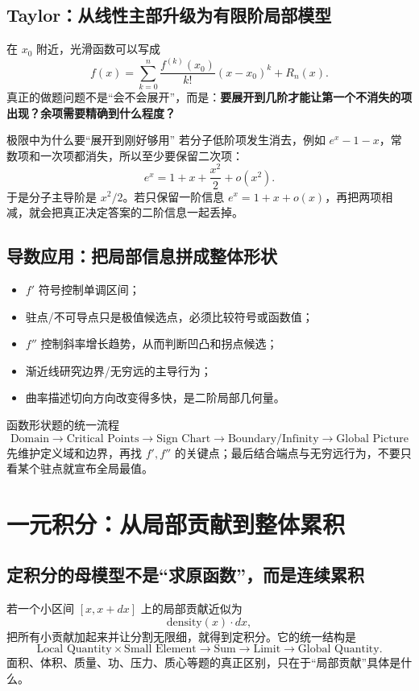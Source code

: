 \documentclass[11pt,a4paper,openany]{ctexbook}
\newcommand{\key}[1]{\textbf{\color{deep}#1}}
\begin{document}
\section{Taylor：从线性主部升级为有限阶局部模型}
在 $x_0$ 附近，光滑函数可以写成
\[
f(x)=\sum_{k=0}^{n}\frac{f^{(k)}(x_0)}{k!}(x-x_0)^k+R_n(x).
\]
真正的做题问题不是“会不会展开”，而是：\key{要展开到几阶才能让第一个不消失的项出现？余项需要精确到什么程度？}

\begin{examplebox}{极限中为什么要“展开到刚好够用”}
若分子低阶项发生消去，例如 $e^x-1-x$，常数项和一次项都消失，所以至少要保留二次项：
\[
e^x=1+x+\frac{x^2}{2}+o(x^2).
\]
于是分子主导阶是 $x^2/2$。若只保留一阶信息 $e^x=1+x+o(x)$，再把两项相减，就会把真正决定答案的二阶信息一起丢掉。
\end{examplebox}

\section{导数应用：把局部信息拼成整体形状}
\begin{itemize}
  \item $f'$ 符号控制单调区间；
  \item 驻点/不可导点只是极值候选点，必须比较符号或函数值；
  \item $f''$ 控制斜率增长趋势，从而判断凹凸和拐点候选；
  \item 渐近线研究边界/无穷远的主导行为；
  \item 曲率描述切向方向改变得多快，是二阶局部几何量。
\end{itemize}

\begin{examBox}{函数形状题的统一流程}
\[
\boxed{\text{Domain}\to\text{Critical Points}\to\text{Sign Chart}\to\text{Boundary/Infinity}\to\text{Global Picture}}
\]
先维护定义域和边界，再找 $f',f''$ 的关键点；最后结合端点与无穷远行为，不要只看某个驻点就宣布全局最值。
\end{examBox}

\chapter{一元积分：从局部贡献到整体累积}

\section{定积分的母模型不是“求原函数”，而是连续累积}
若一个小区间 $[x,x+dx]$ 上的局部贡献近似为
\[
\text{density}(x)\cdot dx,
\]
把所有小贡献加起来并让分割无限细，就得到定积分。它的统一结构是
\[
\boxed{\text{Local Quantity}\times\text{Small Element}\to\text{Sum}\to\text{Limit}\to\text{Global Quantity}}.
\]
面积、体积、质量、功、压力、质心等题的真正区别，只在于“局部贡献”具体是什么。
\end{document}
